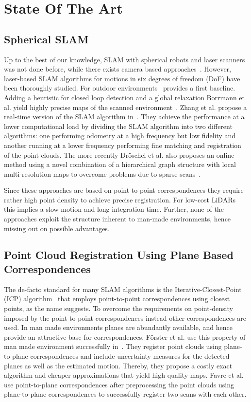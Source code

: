 \section{State Of The Art}

\subsection{Spherical SLAM}

Up to the best of our knowledge, SLAM with spherical robots and laser scanners was not done before, while there exists camera based approaches~\cite{9233654}.
However, laser-based SLAM algorithms for motions in six degrees of freedom (DoF) have been thoroughly studied.
For outdoor environments~\cite{JFR2006} provides a first baseline. Adding a heuristic for closed loop detection and a global relaxation Borrmann et al. yield highly precise maps of the scanned environment~\cite{RAS2007}.
Zhang et al. propose a real-time version of the SLAM algorithm in~\cite{Zhang2014}.
They achieve the performance at a lower computational load by dividing the SLAM algorithm into two different algorithms: one performing odometry at a high frequency but low fidelity and another running at a lower frequency performing fine matching and registration of the point clouds.
The more recently Dröschel et al. also proposes an online method using a novel combination of a hierarchical graph structure with local multi-resolution maps to overcome problems due to sparse scans~\cite{Droeschel2018}.

Since these approaches are based on point-to-point correspondences they require rather high point density to achieve precise registration.
For low-cost LiDARs this implies a slow motion and long integration time.
Further, none of the approaches exploit the structure inherent to man-made environments, hence missing out on possible advantages.

\subsection{Point Cloud Registration Using Plane Based Correspondences}

The de-facto standard for many SLAM algorithms is the Iterative-Closest-Point (ICP) algorithm~\cite{Besl1992} that employs point-to-point correspondences using closest points, as the name suggests. 
To overcome the requirements on point-density imposed by the point-to-point correspondences instead other correspondences are used. 
In man made environments planes are abundantly available, and hence provide an attractive base for correspondences.
Förster et al. use this property of man made environment successfully in~\cite{Foerstner2017}.
They register point clouds using plane-to-plane correspondences and include uncertainty measures for the detected planes as well as the estimated motion.
Thereby, they propose a costly exact algorithm and cheaper approximations that yield high quality maps.
Favre et al.~\cite{favre2021} use point-to-plane correspondences after preprocessing the point clouds using plane-to-plane correspondences to successfully register two scans with each other.

